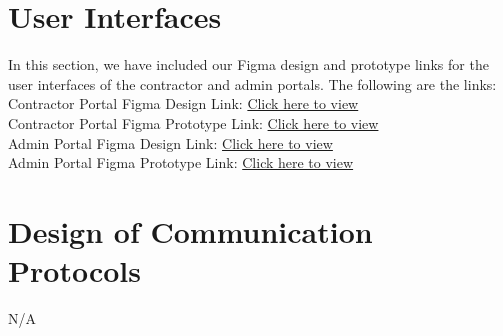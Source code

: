 \documentclass[12pt, titlepage]{article}
\begin{document}

\section{User Interfaces}

In this section, we have included our Figma design and prototype links for
the user interfaces of the contractor and admin portals.
The following are the links:\\

Contractor Portal Figma Design Link:
\href{https://www.figma.com/design/GahKyyNYENo3SdcAqpEoiX/SyncMaster?
node-id=6036-164056}{Click here to view}\\

Contractor Portal Figma Prototype Link:
\href{https://www.figma.com/proto/GahKyyNYENo3SdcAqpEoiX/SyncMaster?
  node-id=11645-13888&p=f&t=jk9BlgaZnti1meDo-1&scaling=scale-down&
  content-scaling=fixed&page-id=6036\%3A164056&starting-point-node-
id=11645\%3A13888}{Click here to view}\\

Admin Portal Figma Design Link:
\href{https://www.figma.com/design/GahKyyNYENo3SdcAqpEoiX/SyncMaster?
node-id=11668-1623}{Click here to view}\\

Admin Portal Figma Prototype Link:
\href{https://www.figma.com/proto/GahKyyNYENo3SdcAqpEoiX/SyncMaster?
  node-id=11668-1625&t=NMRH5A1EbNxP3k37-1&scaling=min-zoom&
  content-scaling=fixed&page-id=11668\%3A1623&
starting-point-node-id=11668\%3A1625}{Click here to view}\\
\section{Design of Communication Protocols}

N/A
\end{document}
